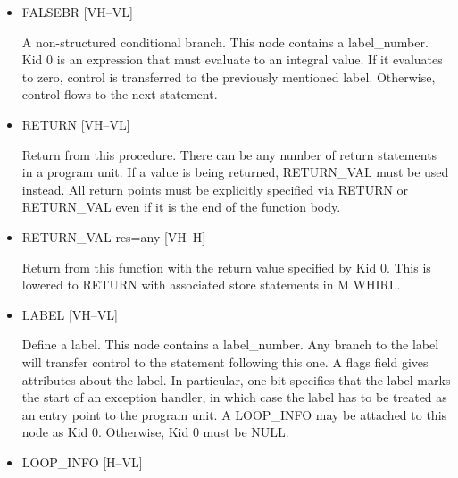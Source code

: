 \documentclass{article}
\begin{document}
\begin{itemize}
%
\item  FALSEBR \hfill [VH--VL]

A non-structured conditional branch. This node contains a
label\_number. Kid 0 is an expression that must evaluate to an integral
value. If it evaluates to zero, control is transferred to the
previously mentioned label. Otherwise, control flows to the next
statement.

\item
{}%
RETURN \hfill [VH--VL]

Return from this procedure. There can be any number of return
statements in a program unit. If a value is being returned,
%
RETURN\_VAL must be used instead. All return points must be explicitly
specified via
%
RETURN or
%
RETURN\_VAL even if it is the end of the function body.


\item
{}%
RETURN\_VAL res=any \hfill [VH--H]

Return from this function with the return value specified by Kid
0. This is lowered to
%
RETURN with associated store statements in M WHIRL.

%
\item  LABEL \hfill [VH--VL]

Define a label. This node contains a label\_number. Any branch to
the label will transfer control to the statement following this
one. A flags field
gives attributes about the label. In particular, one bit specifies
that the label marks the start of an exception handler, in which
case the label has to be treated as an entry point to the program
unit. A LOOP\_INFO may be attached to this node as Kid 0. Otherwise,
Kid 0 must be NULL.

%
\item  LOOP\_INFO \hfill \hfill [H--VL]


\end{itemize}
\end{document}
